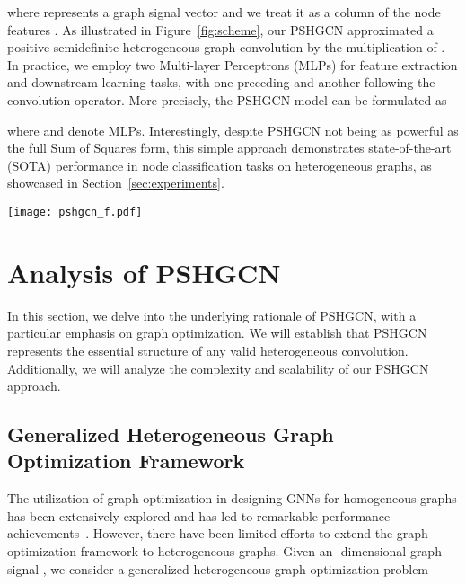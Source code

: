 \documentclass{article}
\begin{document}
where   represents a graph signal vector and we treat it as a column of the node features . As illustrated in Figure~\ref{fig:scheme}, our PSHGCN approximated a positive semidefinite heterogeneous graph convolution by the multiplication of  . In practice, we employ two Multi-layer Perceptrons (MLPs) for feature extraction and downstream learning tasks, with one preceding and another following the convolution operator. More precisely, the PSHGCN model can be formulated as
\begin{tcolorbox}[height=13mm,boxrule=0.5pt,valign=center]

\end{tcolorbox}
where  and  denote MLPs. Interestingly, despite PSHGCN not being as powerful as the full Sum of Squares form, this simple approach demonstrates state-of-the-art (SOTA) performance in node classification tasks on heterogeneous graphs, as showcased in Section~\ref{sec:experiments}.




 














\begin{figure*}[t]
    \centering
    \texttt{[image: pshgcn\_f.pdf]}
\caption{An illustration of the proposed PSHGCN.}
    \label{fig:scheme}
    \vspace{-3mm}
\end{figure*}






\section{Analysis of PSHGCN}
In this section, we delve into the underlying rationale of PSHGCN, with a particular emphasis on graph optimization. We will establish that PSHGCN represents the essential structure of any valid heterogeneous convolution. Additionally, we will analyze the complexity and scalability of our PSHGCN approach.




\subsection{Generalized Heterogeneous Graph Optimization Framework}
The utilization of graph optimization in designing GNNs for homogeneous graphs has been extensively explored and has led to remarkable performance achievements~\cite{zhou2003learning,twirs,bernnet,HF_HL}. However, there have been limited efforts to extend the graph optimization framework to heterogeneous graphs. Given an -dimensional graph signal , we consider a generalized heterogeneous graph optimization problem
\end{document}
